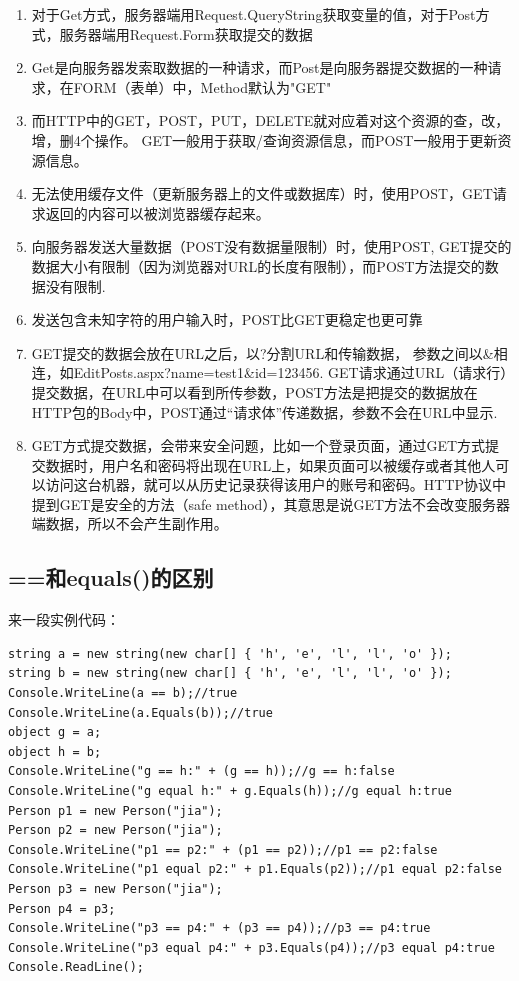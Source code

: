 \documentclass{book}
\begin{document}
\begin{enumerate}
\setcounter{enumi}{0}
\item{对于Get方式，服务器端用Request.QueryString获取变量的值，对于Post方式，服务器端用Request.Form获取提交的数据}
\item{Get是向服务器发索取数据的一种请求，而Post是向服务器提交数据的一种请求，在FORM（表单）中，Method默认为"GET"}
\item{而HTTP中的GET，POST，PUT，DELETE就对应着对这个资源的查，改，增，删4个操作。
GET一般用于获取/查询资源信息，而POST一般用于更新资源信息。}
\item{无法使用缓存文件（更新服务器上的文件或数据库）时，使用POST，GET请求返回的内容可以被浏览器缓存起来。}
\item{向服务器发送大量数据（POST没有数据量限制）时，使用POST,
GET提交的数据大小有限制（因为浏览器对URL的长度有限制），而POST方法提交的数据没有限制.}
\item{发送包含未知字符的用户输入时，POST比GET更稳定也更可靠}
\item{GET提交的数据会放在URL之后，以?分割URL和传输数据，
参数之间以\&相连，如EditPosts.aspx?name=test1\&id=123456.
GET请求通过URL（请求行）提交数据，在URL中可以看到所传参数，POST方法是把提交的数据放在HTTP包的Body中，POST通过“请求体”传递数据，参数不会在URL中显示.}
\item{GET方式提交数据，会带来安全问题，比如一个登录页面，通过GET方式提交数据时，用户名和密码将出现在URL上，如果页面可以被缓存或者其他人可以访问这台机器，就可以从历史记录获得该用户的账号和密码。HTTP协议中提到GET是安全的方法（safe method），其意思是说GET方法不会改变服务器端数据，所以不会产生副作用。}
\end{enumerate}

\subsection{==和equals()的区别}

来一段实例代码：

\begin{lstlisting}[language={[Sharp]C}]
string a = new string(new char[] { 'h', 'e', 'l', 'l', 'o' });
string b = new string(new char[] { 'h', 'e', 'l', 'l', 'o' });
Console.WriteLine(a == b);//true
Console.WriteLine(a.Equals(b));//true
object g = a;
object h = b;
Console.WriteLine("g == h:" + (g == h));//g == h:false
Console.WriteLine("g equal h:" + g.Equals(h));//g equal h:true
Person p1 = new Person("jia");
Person p2 = new Person("jia");
Console.WriteLine("p1 == p2:" + (p1 == p2));//p1 == p2:false
Console.WriteLine("p1 equal p2:" + p1.Equals(p2));//p1 equal p2:false
Person p3 = new Person("jia");
Person p4 = p3;
Console.WriteLine("p3 == p4:" + (p3 == p4));//p3 == p4:true
Console.WriteLine("p3 equal p4:" + p3.Equals(p4));//p3 equal p4:true
Console.ReadLine();
\end{lstlisting}
\end{document}
